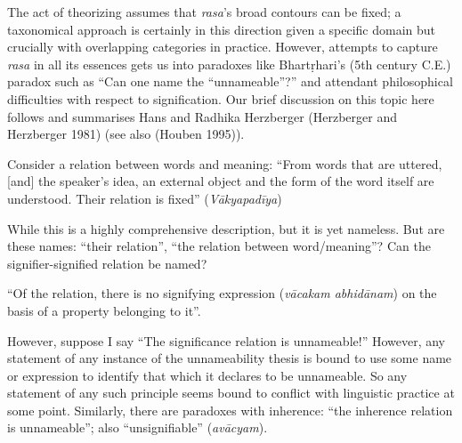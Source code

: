 The act of theorizing assumes that \textsl{rasa}’s broad contours can be fixed; a taxonomical approach is certainly in this direction given a specific domain but crucially with overlapping categories in practice. However, attempts to capture \textsl{rasa} in all its essences gets us into paradoxes like Bhartṛhari's (5th century C.E.) paradox such as “Can one name the “unnameable”?” and attendant philosophical difficulties with respect to signification. Our brief discussion on this topic here follows and summarises Hans and Radhika Herzberger (Herzberger and Herzberger 1981) (see also (Houben 1995)).

\begin{myquote}
Consider a relation between words and meaning: “From words that are uttered, [and] the speaker's idea, an external object and the form of the word itself are understood. Their relation is fixed” (\textsl{Vākyapadīya}) 

While this is a highly comprehensive description, but it is yet nameless. But are these names: “their relation”, “the relation between word/meaning”? Can the signifier-signified relation be named? 

“Of the relation, there is no signifying expression (\textsl{vācakam abhidānam}) on the basis of a property belonging to it”. 

However, suppose I say “The significance relation is unnameable!” However, any statement of any instance of the unnameability thesis is bound to use some name or expression to identify that which it declares to be unnameable. So any statement of any such principle seems bound to conflict with linguistic practice at some point. Similarly, there are paradoxes with inherence: “the inherence relation is unnameable”; also “unsignifiable” (\textsl{avācyam}).
\end{myquote}

